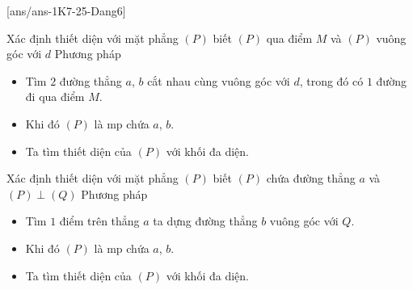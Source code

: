 [ans/ans-1K7-25-Dang6]
\begin{dang}{Xác định thiết diện với mặt phẳng $(P)$ biết $(P)$ qua điểm  $M$ và $(P)$ vuông góc với $d$}
	Phương pháp
	\begin{itemize}
		\item Tìm $2$ đường thẳng  $a$, $b$ cắt nhau cùng vuông góc với $d$, trong đó có $1$ đường đi qua điểm $M$.
		\item Khi đó $(P)$ là mp chứa $a$, $b$.
		\item Ta tìm thiết diện của $(P)$ với khối đa diện.
	\end{itemize}
\end{dang}
\begin{dang}{ Xác định thiết diện với mặt phẳng  $(P)$ biết $(P)$ chứa đường thẳng $a$  và  $(P)\perp (Q)$}
	Phương pháp
	\begin{itemize}
		\item Tìm $1$ điểm trên thẳng  $a$ ta dựng đường thẳng $b$ vuông góc với $Q$.
		\item Khi đó $(P)$ là mp chứa $a$, $b$.
		\item Ta tìm thiết diện của $(P)$ với khối đa diện.
	\end{itemize}
\end{dang}
